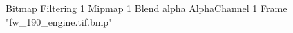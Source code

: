 {Bitmap
	{Filtering 1}
	{Mipmap 1}
	{Blend alpha}
	{AlphaChannel 1}
	{Frame "fw_190_engine.tif.bmp"}
}
